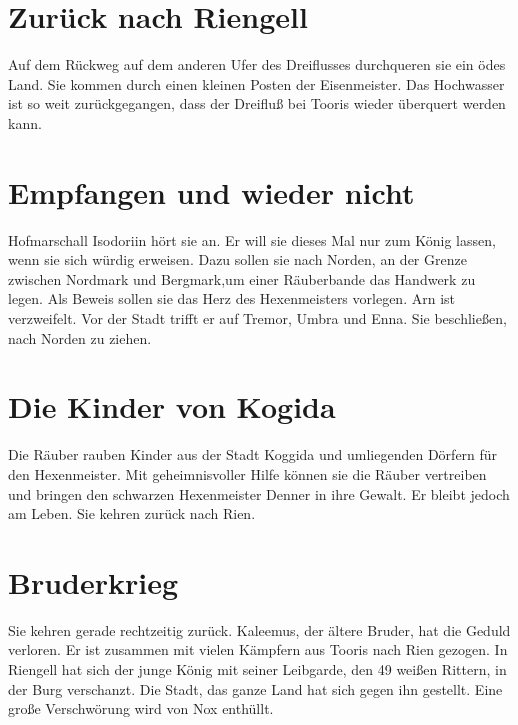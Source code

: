 \documentclass[12pt,a4paper,onecolumn,twoside,ngerman]{book}
\newcommand{\Nox}{Nox}
\newcommand{\Umbra}{Umbra}
\newcommand{\Enna}{Enna}
\newcommand{\Tremor}{Tremor}
\newcommand{\Nordmark}{Nordmark}
\newcommand{\Bergmark}{Bergmark}
\newcommand{\Arn}{Arn}
\newcommand{\Rhingell}{Riengell}
\newcommand{\Rhin}{Rien}
\newcommand{\Kalemus}{Kaleemus}
\newcommand{\Isodoriin}{Isodoriin}
\newcommand{\Kogida}{Koggida}
\newcommand{\Denner}{Denner}
\newcommand{\Dreifluss}{Dreifluß}
\newcommand{\Toris}{Tooris}
\newcommand{\Eisenmeister}{Eisenmeister}
\begin{document}
\section{Zurück nach {\Rhingell}}
Auf dem Rückweg auf dem anderen Ufer des Dreiflusses durchqueren sie ein ödes Land. Sie kommen durch einen kleinen Posten der {\Eisenmeister}.\linebreak 
Das Hochwasser ist so weit zurückgegangen, dass der {\Dreifluss} bei {\Toris} wieder überquert werden kann.


\section{Empfangen und wieder nicht}
Hofmarschall {\Isodoriin} hört sie an. Er will sie dieses Mal nur zum König lassen, wenn sie sich würdig erweisen. Dazu sollen sie nach Norden, an der Grenze zwischen {\Nordmark} und {\Bergmark},um einer Räuberbande das Handwerk zu legen. Als Beweis sollen sie das Herz des Hexenmeisters vorlegen.\linebreak
{\Arn} ist verzweifelt. Vor der Stadt trifft er auf {\Tremor}, {\Umbra} und {\Enna}. Sie beschließen, nach Norden zu ziehen.

\section{Die Kinder von Kogida}
Die Räuber rauben Kinder aus der Stadt {\Kogida} und umliegenden Dörfern für den Hexenmeister. Mit geheimnisvoller Hilfe können sie die Räuber vertreiben und bringen den schwarzen Hexenmeister {\Denner} in ihre Gewalt. Er bleibt jedoch am Leben. Sie kehren zurück nach {\Rhin}.

\section{Bruderkrieg}
Sie kehren gerade rechtzeitig zurück. {\Kalemus}, der ältere Bruder, hat die Geduld verloren. Er ist zusammen mit vielen Kämpfern aus {\Toris} nach {\Rhin} gezogen. In {\Rhingell} hat sich der junge König mit seiner Leibgarde, den 49 weißen Rittern, in der Burg verschanzt. Die Stadt, das ganze Land hat sich gegen ihn gestellt.\linebreak
Eine große Verschwörung wird von {\Nox} enthüllt.
\end{document}
